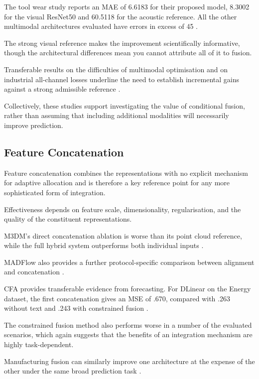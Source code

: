 The tool wear study reports an MAE of 6.6183 for their proposed model, 8.3002 for the visual
ResNet50 and 60.5118 for the acoustic reference. All the other multimodal architectures evaluated
have errors in excess of 45 \parencite[Table~1]{zhang_tool_2026}.

The strong visual reference makes the improvement scientifically informative, though the
architectural differences mean you cannot attribute all of it to fusion.

Transferable results on the difficulties of multimodal optimisation and on industrial all-channel
losses underline the need to establish incremental gains against a strong admissible reference
\parencite{wang_what_2020,goodarzi_deep_2023}.

Collectively, these studies support investigating the value of conditional fusion, rather than
assuming that including additional modalities will necessarily improve prediction.

\subsection{Feature Concatenation}

Feature concatenation combines the representations with no explicit mechanism for adaptive
allocation and is therefore a key reference point for any more sophisticated form of integration.

Effectiveness depends on feature scale, dimensionality, regularisation, and the quality of the
constituent representations.

M3DM's direct concatenation ablation is worse than its point cloud reference, while the full hybrid
system outperforms both individual inputs \parencite[Table~4]{wang_multimodal_2023}.

MADFlow also provides a further protocol-specific comparison between alignment and concatenation
\parencite{li_madflow_2025}.

CFA provides transferable evidence from forecasting. For DLinear on the Energy dataset, the first
concatenation gives an MSE of .670, compared with .263 without text and .243 with constrained fusion
\parencite[Table~4]{lee_rethinking_2026}.

The constrained fusion method also performs worse in a number of the evaluated scenarios, which
again suggests that the benefits of an integration mechanism are highly task-dependent.

Manufacturing fusion can similarly improve one architecture at the expense of the other under the
same broad prediction task \parencite[Table~3]{li_feature-level_2022}.

